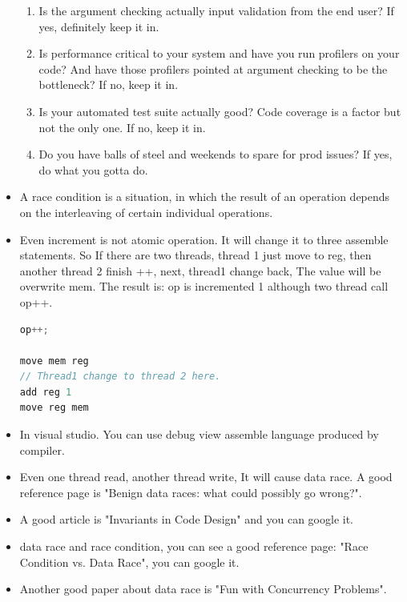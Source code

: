 \documentclass[a4paper,11pt,twoside]{book}
\begin{document}
\begin{itemize}
	\begin{enumerate}
		\item Is the argument checking actually input validation from the end user? If yes, definitely keep it in.
		
		\item Is performance critical to your system and have you run profilers on your code? And have those profilers pointed at argument checking to be the bottleneck? If no, keep it in.
		
		\item Is your automated test suite actually good? Code coverage is a factor but not the only one. If no, keep it in.
		
		\item Do you have balls of steel and weekends to spare for prod issues? If yes, do what you gotta do.
	\end{enumerate}
	
	\item A race condition is a situation, in which the result of an operation depends on the interleaving of certain individual operations.
	
	\item Even increment is not atomic operation. It will change it to three assemble statements. So If there are two threads, thread 1 just move to reg, then another thread 2 finish ++, next, thread1 change back, The value will be overwrite mem. The result is: op is incremented 1 although two thread call op++.
\begin{lstlisting}[frame=single, language=c++]
op++;

move mem reg
// Thread1 change to thread 2 here. 
add reg 1
move reg mem
\end{lstlisting}		
	
	\item In visual studio. You can use debug view assemble language produced by compiler. 
	
	\item Even one thread read, another thread write, It will cause data race. A good reference page is "Benign data races: what could possibly go wrong?". 
	
	\item A good article is "Invariants in Code Design" and you can google it.
	
	\item data race and race condition, you can see a good reference page: "Race Condition vs. Data Race", you can google it.
	\item Another good paper about data race is "Fun with Concurrency Problems".
\end{itemize}
\end{document}
